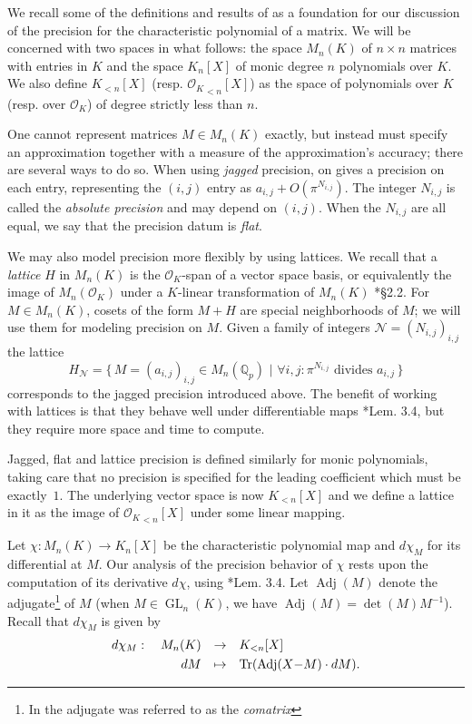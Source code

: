 \documentclass{sig-alternate-05-2015}
\DeclareMathOperator{\GL}{GL}
\DeclareMathOperator{\tr}{Tr}
\DeclareMathOperator{\adj}{Adj}
\newcommand{\Q}{\mathbb Q}
\newcommand{\Qp}{\Q_p}
\newcommand{\OK}{\mathcal{O}_K}
\newcommand{\famN}{\mathcal{N}}
\begin{document}
We recall some of the definitions and results of \cite{caruso-roe-vaccon:14a}
as a foundation for our discussion of the precision for the characteristic polynomial
of a matrix.  We will be concerned with two spaces in what follows:
the space $M_n(K)$ of $n \times n$ matrices with entries in $K$ and the space
$K_n[X]$ of monic degree $n$ polynomials over $K$.  We also define $K_{<n}[X]$ (resp. 
${\OK}_{<n}[X]$) as the space of polynomials over $K$ (resp. over $\OK$) 
of degree strictly less than $n$.

One cannot represent
matrices $M \in M_n(K)$ exactly, but instead must specify an approximation
together with a measure of the approximation's accuracy; there are several ways to do so.
When using \emph{jagged} precision, on gives a precision on each entry,
representing the $(i,j)$ entry as $a_{i,j} + O(\pi^{N_{i,j}})$. The integer $N_{i,j}$ 
is called the \emph{absolute precision} and may depend on $(i,j)$.
When the $N_{i,j}$ are all equal, we say that the precision datum is 
\emph{flat}.

We may also model precision more flexibly by using lattices.  We 
recall that a \emph{lattice} $H$ in $M_n(K)$ is the $\OK$-span of a vector
space basis, or equivalently the image of $M_n(\OK)$ under a 
$K$-linear transformation of $M_n(K)$ \cite{caruso-roe-vaccon:14a}*{\S 2.2}.
For $M \in M_n(K)$, cosets of the form $M + H$ are special
neighborhoods of $M$; we will use them for modeling precision on $M$. 
Given a family of integers $\famN = (N_{i,j})_{i,j}$ the lattice
\[
H_{\famN} = \big\{ \, M = (a_{i,j})_{i,j} \in M_n(\Qp) \,\, | \,\, \forall i,\!j\!:
\pi^{N_{i,j}} \text{ divides } a_{i,j} \, \big\}
\]
corresponds to the jagged precision introduced above.
The benefit of working with lattices is that they behave well under 
differentiable maps \cite{caruso-roe-vaccon:14a}*{Lem. 3.4}, but they
require more space and time to compute. 

Jagged, flat and lattice precision is defined similarly for monic polynomials, 
taking care that no precision is specified for the leading 
coefficient which must be exactly~$1$. The underlying 
vector space is now $K_{<n}[X]$ and we define a lattice in it as the
image of ${\OK}_{<n}[X]$ under some linear mapping.

Let $\chi : M_n(K) \to K_n[X]$ be the characteristic polynomial map
and $d \chi_M$ for its differential at $M$.
Our analysis of the precision behavior of $\chi$ rests upon
the computation of its derivative $d\chi$, using \cite{caruso-roe-vaccon:14a}*{Lem. 3.4}.
Let $\adj(M)$ denote the adjugate\footnote{In  the adjugate was referred to as the \emph{comatrix}} of $M$ (when $M \in \GL_n(K)$,
we have $\adj(M) {=} \det(M) M^{-1}$).  Recall
that $d\chi_M$ is given by
\begin{equation} \label{eq:dchi}
\begin{array}{rcl}
d\chi_M: \quad M_n(K) & \to & K_{<n}[X] \smallskip \\
 dM & \mapsto & \tr(\adj(X{-}M) \cdot dM).
\end{array}
\end{equation}
\end{document}
